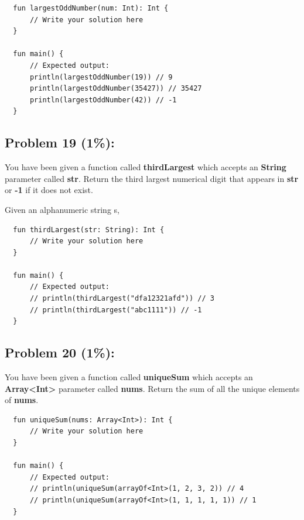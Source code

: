 \documentclass{article}
\begin{document}
\begin{verbatim}
  fun largestOddNumber(num: Int): Int {
      // Write your solution here   
  }

  fun main() {
      // Expected output:
      println(largestOddNumber(19)) // 9
      println(largestOddNumber(35427)) // 35427
      println(largestOddNumber(42)) // -1
  }
\end{verbatim}

\subsection*{Problem 19 (1\%):}
You have been given a function called \textbf{thirdLargest} which accepts an \textbf{String} parameter called \textbf{str}. Return the third largest numerical digit that appears in \textbf{str} or \textbf{-1} if it does not exist.

Given an alphanumeric string s, 
\begin{verbatim}
  fun thirdLargest(str: String): Int {
      // Write your solution here
  }

  fun main() {
      // Expected output:
      // println(thirdLargest("dfa12321afd")) // 3
      // println(thirdLargest("abc1111")) // -1
  }
\end{verbatim}

\subsection*{Problem 20 (1\%):}
You have been given a function called \textbf{uniqueSum} which accepts an \textbf{Array<Int>} parameter called \textbf{nums}. Return the sum of all the unique elements of \textbf{nums}.

\begin{verbatim}
  fun uniqueSum(nums: Array<Int>): Int {
      // Write your solution here 
  }

  fun main() {
      // Expected output:
      // println(uniqueSum(arrayOf<Int>(1, 2, 3, 2)) // 4
      // println(uniqueSum(arrayOf<Int>(1, 1, 1, 1, 1)) // 1
  }
\end{verbatim}
\end{document}
